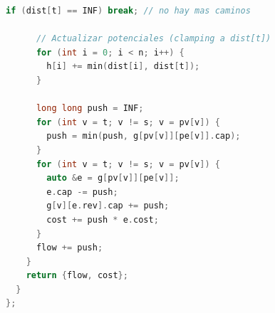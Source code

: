 \begin{lstlisting}[style=mystyle, language=C++]
      if (dist[t] == INF) break; // no hay mas caminos

      // Actualizar potenciales (clamping a dist[t])
      for (int i = 0; i < n; i++) {
        h[i] += min(dist[i], dist[t]);
      }

      long long push = INF;
      for (int v = t; v != s; v = pv[v]) {
        push = min(push, g[pv[v]][pe[v]].cap);
      }
      for (int v = t; v != s; v = pv[v]) {
        auto &e = g[pv[v]][pe[v]];
        e.cap -= push;
        g[v][e.rev].cap += push;
        cost += push * e.cost;
      }
      flow += push;
    }
    return {flow, cost};
  }
};
\end{lstlisting}
